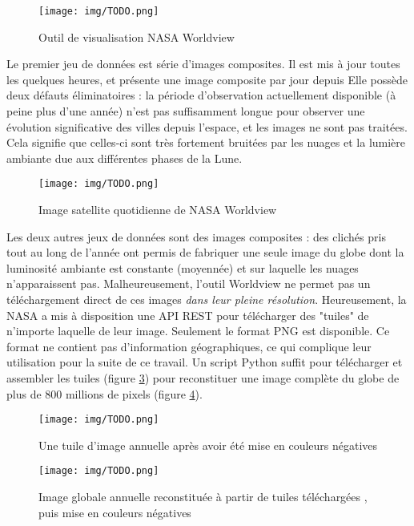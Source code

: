 \documentclass[a4paper]{report}
\begin{document}
\begin{figure}[h]
	\centering
	\texttt{[image: img/TODO.png]}
	\caption{Outil de visualisation NASA Worldview \cite{nasa-worldview}}
	\label{nasa-worldview-screenshot}
\end{figure}

Le premier jeu de données est série d'images composites. Il est mis à jour toutes les quelques heures, et présente une image composite par jour depuis %
Elle possède deux défauts éliminatoires : la période d'observation actuellement disponible (à peine plus d'une année) n'est pas suffisamment longue pour observer une évolution significative des villes depuis l'espace, et les images ne sont pas traitées. Cela signifie que celles-ci sont très fortement bruitées par les nuages et la lumière ambiante due aux différentes phases de la Lune.

\begin{figure}[h]
	\centering
	\texttt{[image: img/TODO.png]}
	\caption{Image satellite quotidienne de NASA Worldview \cite{nasa-worldview}}
	\label{nasa-worldview-daily}
\end{figure}

Les deux autres jeux de données sont des images composites : des clichés pris tout au long de l'année ont permis de fabriquer une seule image du globe dont la luminosité ambiante est constante (moyennée) et sur laquelle les nuages n'apparaissent pas. Malheureusement, l'outil Worldview ne permet pas un téléchargement direct de ces images \textit{dans leur pleine résolution}. Heureusement, la NASA a mis à disposition une API REST pour télécharger des "tuiles" de n'importe laquelle de leur image. Seulement le format PNG est disponible. Ce format ne contient pas d'information géographiques, ce qui complique leur utilisation pour la suite de ce travail. Un script Python suffit pour télécharger et assembler les tuiles (figure \ref{nasa-worldview-tile}) pour reconstituer une image complète du globe de plus de 800 millions de pixels (figure \ref{nasa-worldview-tiles}).

\begin{figure}[h]
	\centering
	\texttt{[image: img/TODO.png]}
	\caption{Une tuile d'image annuelle \cite{nasa-api} après avoir été mise en couleurs négatives}
	\label{nasa-worldview-tile}
\end{figure}

\begin{figure}[h]
	\centering
	\texttt{[image: img/TODO.png]}
	\caption{Image globale annuelle reconstituée à partir de tuiles téléchargées \cite{nasa-api}, puis mise en couleurs négatives}
	\label{nasa-worldview-tiles}
\end{figure}
\end{document}
